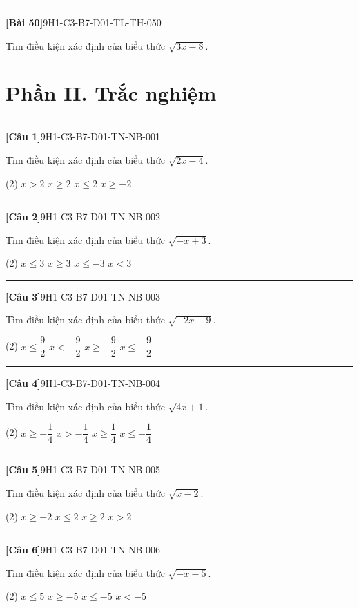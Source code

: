 \documentclass[12pt,a4paper]{article}
\newif\ifloigiai
\newenvironment{cauhoi}[2]{%
  \par\medskip\noindent\rule{\textwidth}{0.4pt}\par\nopagebreak
  \noindent\textbf{[#1]}\hfill{\scriptsize\ttfamily #2}\par\nopagebreak\smallskip}{\par}
\newcommand{\loigiai}[1]{\ifloigiai\par\smallskip\noindent\textit{Lời giải.} #1\par\fi}
\newcommand{\dapan}[1]{\ifloigiai\par\smallskip\noindent\textit{Đáp án:} \textbf{#1}\par\fi}
\begin{document}
\begin{cauhoi}{Bài 50}{9H1-C3-B7-D01-TL-TH-050}
Tìm điều kiện xác định của biểu thức $\sqrt{3x - 8}$.
\loigiai{Biểu thức xác định khi $3x - 8\ge 0$, tức là $x\ge \dfrac{8}{3}$.}
\end{cauhoi}
\clearpage\section*{Phần II. Trắc nghiệm}
\begin{cauhoi}{Câu 1}{9H1-C3-B7-D01-TN-NB-001}
Tìm điều kiện xác định của biểu thức $\sqrt{2x - 4}$.
\begin{tasks}(2)
\task $x>2$
\task $x\ge 2$
\task $x\le 2$
\task $x\ge -2$
\end{tasks}
\dapan{B}
\end{cauhoi}
\begin{cauhoi}{Câu 2}{9H1-C3-B7-D01-TN-NB-002}
Tìm điều kiện xác định của biểu thức $\sqrt{-x + 3}$.
\begin{tasks}(2)
\task $x\le 3$
\task $x\ge 3$
\task $x\le -3$
\task $x<3$
\end{tasks}
\dapan{A}
\end{cauhoi}
\begin{cauhoi}{Câu 3}{9H1-C3-B7-D01-TN-NB-003}
Tìm điều kiện xác định của biểu thức $\sqrt{-2x - 9}$.
\begin{tasks}(2)
\task $x\le \dfrac{9}{2}$
\task $x<-\dfrac{9}{2}$
\task $x\ge -\dfrac{9}{2}$
\task $x\le -\dfrac{9}{2}$
\end{tasks}
\dapan{D}
\end{cauhoi}
\begin{cauhoi}{Câu 4}{9H1-C3-B7-D01-TN-NB-004}
Tìm điều kiện xác định của biểu thức $\sqrt{4x + 1}$.
\begin{tasks}(2)
\task $x\ge -\dfrac{1}{4}$
\task $x>-\dfrac{1}{4}$
\task $x\ge \dfrac{1}{4}$
\task $x\le -\dfrac{1}{4}$
\end{tasks}
\dapan{A}
\end{cauhoi}
\begin{cauhoi}{Câu 5}{9H1-C3-B7-D01-TN-NB-005}
Tìm điều kiện xác định của biểu thức $\sqrt{x - 2}$.
\begin{tasks}(2)
\task $x\ge -2$
\task $x\le 2$
\task $x\ge 2$
\task $x>2$
\end{tasks}
\dapan{C}
\end{cauhoi}
\begin{cauhoi}{Câu 6}{9H1-C3-B7-D01-TN-NB-006}
Tìm điều kiện xác định của biểu thức $\sqrt{-x - 5}$.
\begin{tasks}(2)
\task $x\le 5$
\task $x\ge -5$
\task $x\le -5$
\task $x<-5$
\end{tasks}
\dapan{C}
\end{cauhoi}
\end{document}

